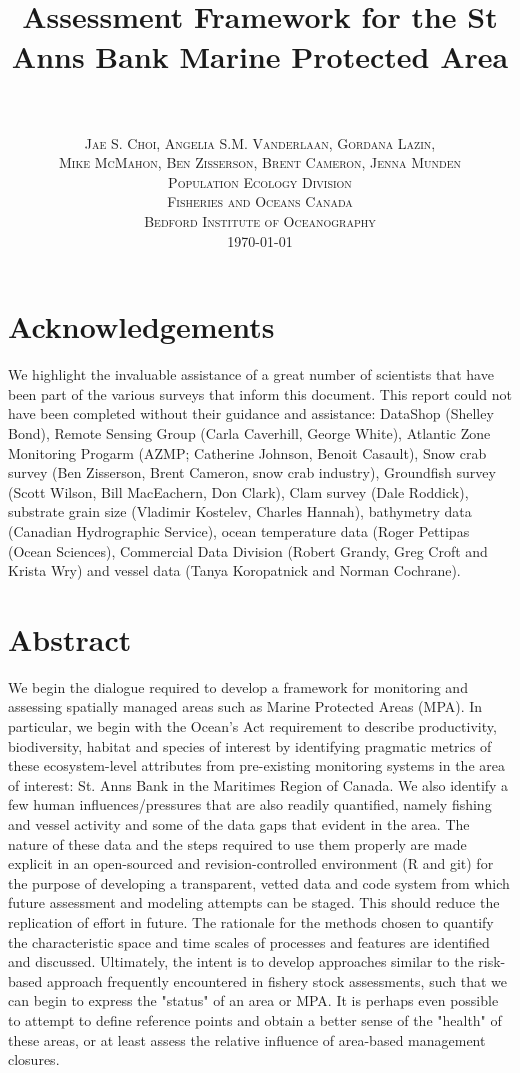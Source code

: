\documentclass[letterpaper,portrait,11pt]{scrartcl}
\title{
		\usefont{OT1}{bch}{b}{n}
		\horrule{0.5pt} \\[0.4cm]
		\huge Assessment Framework for the St Anns Bank Marine Protected Area  \\
		\horrule{2pt} \\[1.0cm]
}
\author{
		\normalfont \normalsize  \textsc{Jae S. Choi, Angelia S.M. Vanderlaan, Gordana Lazin,} \\
    \normalfont \normalsize  \textsc{Mike McMahon,  Ben Zisserson, Brent Cameron, Jenna Munden} \\ [25pt]		
		\normalfont \normalsize \textsc{Population Ecology Division} \\ 
    \normalfont \normalsize \textsc{Fisheries and Oceans Canada} \\ 
    \normalfont \normalsize \textsc{Bedford Institute of Oceanography} \\ [25pt]
    \normalsize \textsc{\today}
}
\date{}
\numberwithin{equation}{section}		%
\numberwithin{figure}{section}		%
\numberwithin{table}{section}				%
\begin{document}
\maketitle

\setlength{\parskip}{12 pt} %
\setlength{\parindent}{0cm}
\setlength{\floatsep}{2cm}
\setcounter{tocdepth}{2} %
\setcounter{secnumdepth}{3} %
\tableofcontents 

\section*{Acknowledgements}

We highlight the invaluable assistance of a great number of scientists that have been part of the various surveys that inform this document. This report could not have been completed without their guidance and assistance: DataShop (Shelley Bond), Remote Sensing Group (Carla Caverhill, George White), Atlantic Zone Monitoring Progarm (AZMP; Catherine Johnson, Benoit Casault), Snow crab survey (Ben Zisserson, Brent Cameron, snow crab industry), Groundfish survey (Scott Wilson, Bill MacEachern, Don Clark), Clam survey (Dale Roddick), substrate grain size (Vladimir Kostelev, Charles Hannah), bathymetry data (Canadian Hydrographic Service), ocean temperature data (Roger Pettipas (Ocean Sciences), Commercial Data Division (Robert Grandy, Greg Croft and Krista Wry) and vessel data (Tanya Koropatnick and Norman Cochrane).

\section*{Abstract}

We begin the dialogue required to develop a framework for monitoring and assessing spatially managed areas such as Marine Protected Areas (MPA). In particular, we begin with the Ocean's Act requirement to describe productivity, biodiversity, habitat and species of interest by identifying pragmatic metrics of these ecosystem-level attributes from pre-existing monitoring systems in the area of interest: St. Anns Bank in the Maritimes Region of Canada. We also identify a few human influences/pressures that are also readily quantified, namely fishing and vessel activity and some of the data gaps that evident in the area. The nature of these data and the steps required to use them properly are made explicit in an open-sourced and revision-controlled environment (R and git) for the purpose of developing a transparent, vetted data and code system from which future assessment and modeling attempts can be staged. This should reduce the replication of effort in future. The rationale for the methods chosen to quantify the characteristic space and time scales of processes and features are identified and discussed. Ultimately, the intent is to develop approaches similar to the risk-based approach frequently encountered in fishery stock assessments, such that we can begin to express the "status" of an area or MPA. It is perhaps even possible to attempt to define reference points and obtain a better sense of the "health" of these areas, or at least assess the relative influence of area-based management closures. 
\end{document}
